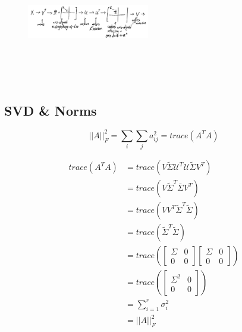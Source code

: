 \begin{figure}
	\centering
	\includegraphics[width=2.1in,height=2.1in]{figures/ch05/figure3.png}
\end{figure}

\subsection{SVD \& Norms}

\begin{equation*}
||A||^2_F = \sum_i\sum_j a_{ij}^2 = trace(A^TA)
\end{equation*}

\begin{align*}
trace(A^TA) &= trace(V\tilde{\Sigma}\mathcal{U}^T\mathcal{U}\tilde{\Sigma}V^T)\\
&= trace(V\tilde{\Sigma}^T\bar{\Sigma}V^T)\\
&= trace(VV^T\tilde{\Sigma}^T\tilde{\Sigma})\\
&= trace(\tilde{\Sigma}^T\tilde{\Sigma})\\
&= trace(
\begin{bmatrix}%
\Sigma & 0\\
0 & 0
\end{bmatrix}
\begin{bmatrix}%
\Sigma & 0\\
0 & 0
\end{bmatrix})\\
&= trace(
\begin{bmatrix}%
\Sigma^2 & 0\\
0 & 0
\end{bmatrix})\\
&= \sum^r_{i=1}\sigma_i^2 \\
&= ||A||^2_F
\end{align*}
